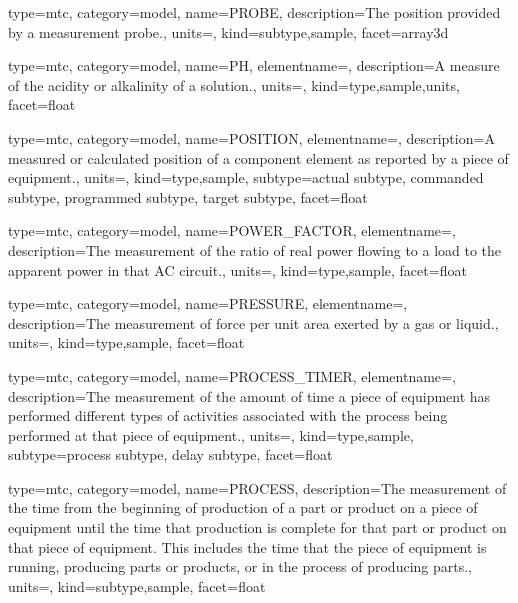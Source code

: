 {
  type=mtc,
  category=model,
  name={PROBE},
  description={The position provided by a measurement probe.},
  units=,
  kind={subtype,sample},
  facet={\gls{array3d}}
}


{
  type=mtc,
  category=model,
  name={PH},
  elementname=,
  description={A measure of the acidity or alkalinity of a solution.},
  units=,
  kind={type,sample,units},
  facet={\gls{float}}
}


{
  type=mtc,
  category=model,
  name={POSITION},
  elementname=,
  description={A measured or calculated position of a \gls{component} element as reported by a piece of equipment.},
  units=,
  kind={type,sample},
  subtype={\gls{actual subtype}, \gls{commanded subtype}, \gls{programmed subtype}, \gls{target subtype}},
  facet={\gls{float}}
}


{
  type=mtc,
  category=model,
  name={POWER\_FACTOR},
  elementname=,
  description={The measurement of the ratio of real power flowing to a load to the apparent power in that AC circuit.},
  units=,
  kind={type,sample},
  facet={\gls{float}}
}


{
  type=mtc,
  category=model,
  name={PRESSURE},
  elementname=,
  description={The measurement of force per unit area exerted by a gas or liquid.},
  units=,
  kind={type,sample},
  facet={\gls{float}}
}


{
  type=mtc,
  category=model,
  name={PROCESS\_TIMER},
  elementname=,
  description={The measurement of the amount of time a piece of equipment has performed different types of activities associated with the process being performed at that piece of equipment.},
  units=,
  kind={type,sample},
  subtype={\gls{process subtype}, \gls{delay subtype}},
  facet={\gls{float}}
}




{
  type=mtc,
  category=model,
  name={PROCESS},
  description={The measurement of the time from the beginning of production of a part or product on a piece of equipment until the time that production is complete for that part or product on that piece of equipment.  This includes the time that the piece of equipment is running, producing parts or products, or in the process of producing parts.},
  units=,
  kind={subtype,sample},
  facet={\gls{float}}
}


